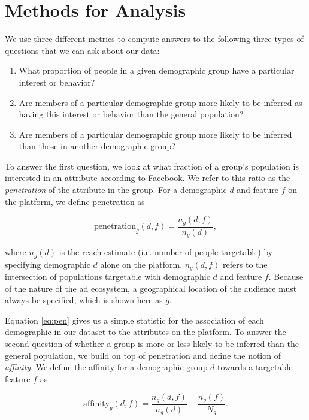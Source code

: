 \section{Methods for Analysis} \label{sec:methods}
We use three different metrics to compute answers to the following three types of questions that we can ask about our data:

\begin{enumerate}
\item What proportion of people in a given demographic group have a particular interest or behavior?
\item Are members of a particular demographic group more likely to be inferred as having this interest or behavior than the general population?
\item Are members of a particular demographic group more likely to be inferred than those in another demographic group?
\end{enumerate}

To answer the first question, we look at what fraction of a group's population is interested in an attribute according to Facebook. We refer to this ratio as the \textit{penetration} of the attribute in the group. For a demographic $d$ and feature $f$ on the platform, we define penetration as

\begin{equation}
\text{penetration}_g(d, f) = \frac{n_g(d, f)}{n_g(d)},
\label{eq:pen}
\end{equation}

where $n_g(d)$ is the reach estimate (i.e. number of people targetable) by specifying demographic $d$ alone on the platform. $n_g(d, f)$ refers to the intersection of populations targetable with demographic $d$ and feature $f$. Because of the nature of the ad ecosystem, a geographical location of the audience must always be specified, which is shown here as $g$.

Equation \ref{eq:pen} gives us a simple statistic for the association of each demographic in our dataset to the attributes on the platform. To answer the second question of whether a group is more or less likely to be inferred than the general population, we build on top of penetration and define the notion of \textit{affinity}. We define the affinity for a demographic group $d$ towards a targetable feature $f$ as

\begin{equation}
\text{affinity}_g(d, f) = \frac{n_g(d, f)}{n_g(d)} - \frac{n_g(f)}{N_g}.
\label{eq:aff}
\end{equation}

